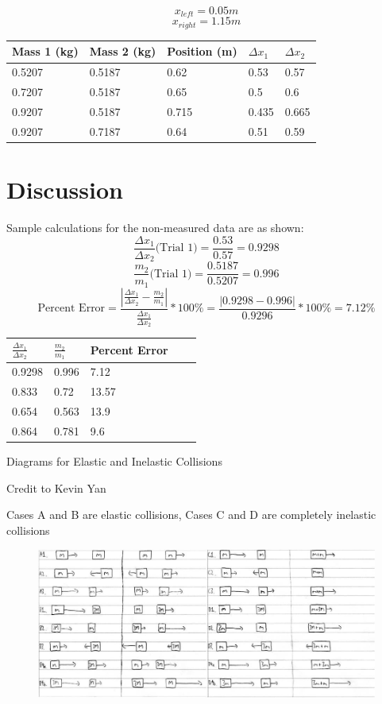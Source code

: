 \documentclass[11pt, titlepage]{article}
\begin{document}
\begin{center}
$$x_{left} = 0.05 m$$
$$x_{right} = 1.15 m$$
\begin{tabular}
{|m{7em}|m{7em}|m{7em}|m{7em}|m{7em}|}
\hline
Mass 1 (kg) & Mass 2 (kg) & Position (m) & $\Delta x_1$ & $\Delta x_2$ \\
\hline
0.5207 & 0.5187 & 0.62 & 0.53 & 0.57\\
\hline
0.7207 & 0.5187 & 0.65 & 0.5 & 0.6\\
\hline
0.9207 & 0.5187 & 0.715 & 0.435 & 0.665\\ 
\hline
0.9207 & 0.7187 & 0.64 & 0.51 & 0.59\\
\hline
\end{tabular}
\end{center}

\section*{Discussion}
Sample calculations for the non-measured data are as shown:
$$\frac{\Delta x_1}{\Delta x_2} \text{(Trial 1)} = \frac{0.53}{0.57} = 0.9298$$
$$\frac{m_2}{m_1} \text{(Trial 1)} = \frac{0.5187}{0.5207} = 0.996$$
$$\text{Percent Error} = \frac{|\frac{\Delta x_1}{\Delta x_2} - \frac{m_2}{m_1}|}{\frac{\Delta x_1}{\Delta x_2}} * 100\% = \frac{|0.9298 - 0.996|}{0.9296} * 100\% = 7.12\%$$

\begin{center}
\begin{tabular}
{|m{7em}|m{7em}|m{7em}|m{7em}|m{7em}|}
\hline
$\frac{\Delta x_1}{\Delta x_2}$ & $\frac{m_2}{m_1}$ & Percent Error \\
\hline
0.9298 & 0.996 & 7.12 \\
\hline
0.833 & 0.72 & 13.57 \\
\hline
0.654 & 0.563 & 13.9 \\
\hline
0.864 & 0.781 & 9.6 \\
\hline
\end{tabular}
\end{center}

Diagrams for Elastic and Inelastic Collisions

Credit to Kevin Yan

Cases A and B are elastic collisions, Cases C and D are completely inelastic collisions

\begin{figure}[p]
\centering
\hspace*{-7cm}
\includegraphics[scale=1, angle=270]{diagram6.jpg}
\vspace*{19cm}
\end{figure}
\end{document}
